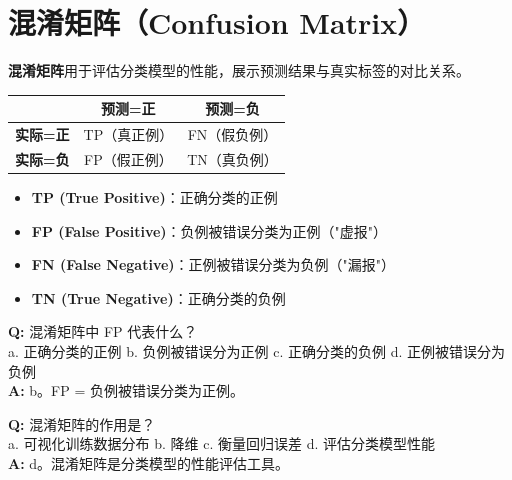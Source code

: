 \documentclass[11pt,a4paper]{article}
\begin{document}
\section{混淆矩阵（Confusion Matrix）}

\begin{bluebox}[混淆矩阵的作用]
\textbf{混淆矩阵}用于评估分类模型的性能，展示预测结果与真实标签的对比关系。
\end{bluebox}

\begin{orangebox}[混淆矩阵四象限]
\begin{center}
\begin{tabular}{l|c|c}
 & \textbf{预测=正} & \textbf{预测=负} \\
\hline
\textbf{实际=正} & TP（真正例） & FN（假负例） \\
\textbf{实际=负} & FP（假正例） & TN（真负例） \\
\end{tabular}
\end{center}

\begin{itemize}
    \item \textbf{TP (True Positive)}：正确分类的正例
    \item \textbf{FP (False Positive)}：负例被错误分类为正例（"虚报"）
    \item \textbf{FN (False Negative)}：正例被错误分类为负例（"漏报"）
    \item \textbf{TN (True Negative)}：正确分类的负例
\end{itemize}
\end{orangebox}

\begin{examplebox}
\textbf{Q:} 混淆矩阵中 FP 代表什么？\\
a. 正确分类的正例 \quad b. 负例被错误分为正例 \quad c. 正确分类的负例 \quad d. 正例被错误分为负例\\
\textbf{A:} b。FP = 负例被错误分类为正例。
\end{examplebox}

\begin{examplebox}[例题：混淆矩阵的作用]
\textbf{Q:} 混淆矩阵的作用是？\\
a. 可视化训练数据分布 \quad b. 降维 \quad c. 衡量回归误差 \quad d. 评估分类模型性能\\
\textbf{A:} d。混淆矩阵是分类模型的性能评估工具。
\end{examplebox}
\end{document}
